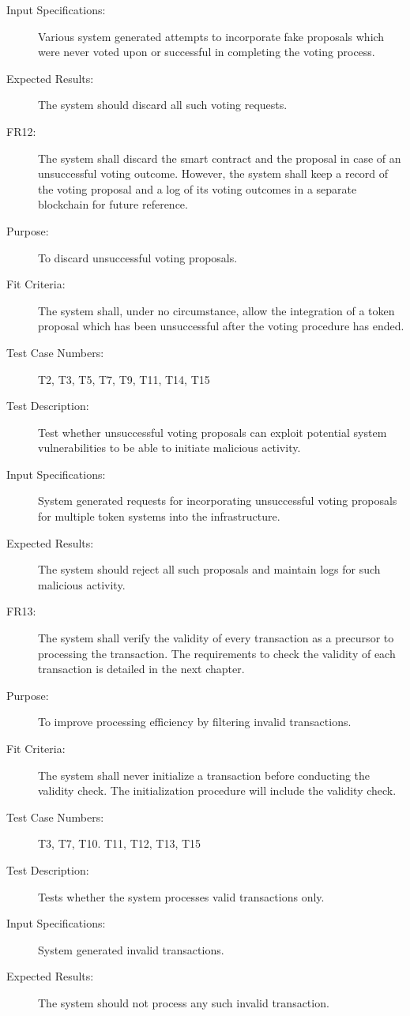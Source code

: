 \documentclass[a4paper,twoside,phd]{BYUPhys}
\begin{document}
\begin{description}
\item[Input Specifications:] Various system generated attempts to incorporate fake proposals which were never voted upon or successful in completing the voting process.
\item[Expected Results:] The system should discard all such voting requests.
\\
\item[FR12:] The system shall discard the smart contract and the proposal in case of an unsuccessful voting outcome. However, the system shall keep a record of the voting proposal and a log of its voting outcomes in a separate blockchain for future reference.
\item[Purpose:] To discard unsuccessful voting proposals.
\item[Fit Criteria:] The system shall, under no circumstance, allow the integration of a token proposal which has been unsuccessful after the voting procedure has ended.
\item[Test Case Numbers:] T2, T3, T5, T7, T9, T11, T14, T15
\item[Test Description:] Test whether unsuccessful voting proposals can exploit potential system vulnerabilities to be able to initiate malicious activity.
\item[Input Specifications:] System generated requests for incorporating unsuccessful voting proposals for multiple token systems into the infrastructure.
\item[Expected Results:] The system should reject all such proposals and maintain logs for such malicious activity.
\\
\item[FR13:] The system shall verify the validity of every transaction as a precursor to processing the transaction. The requirements to check the validity of each transaction is detailed in the next chapter.
\item[Purpose:] To improve processing efficiency by filtering invalid transactions.
\item[Fit Criteria:] The system shall never initialize a transaction before conducting the validity check. The initialization procedure will include the validity check. 
\item[Test Case Numbers:] T3, T7, T10. T11, T12, T13, T15
\item[Test Description:] Tests whether the system processes valid transactions only.
\item[Input Specifications:] System generated invalid transactions.
\item[Expected Results:] The system should not process any such invalid transaction.

\end{description}
\end{document}
